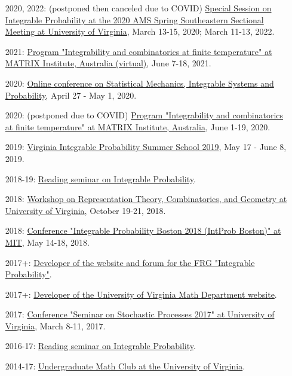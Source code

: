\documentclass[letterpaper,11pt]{article}
\begin{document}
\begin{itemize}
\item [2020, 2022:]
(postponed then canceled due to COVID)
\href{http://www.ams.org/meetings/sectional/2273_program.html}{Special Session on Integrable Probability at the 2020 AMS Spring Southeastern Sectional Meeting at University of Virginia},
March 13-15, 2020; March 11-13, 2022.

\item [2021:]
\href{https://www.matrix-inst.org.au/events/integrability-and-combinatorics-at-finite-temperature/}{Program "Integrability and combinatorics at finite temperature" at MATRIX Institute, Australia (virtual)},
June 7-18, 2021.

\item [2020:]
\href{http://mtikhonov.com/smisp/}{Online conference on Statistical Mechanics, Integrable Systems and Probability},
April 27 - May 1, 2020.

\item [2020:]
(postponed due to COVID)
\href{https://www.matrix-inst.org.au/events/integrability-and-combinatorics-at-finite-temperature/}{Program "Integrability and combinatorics at finite temperature" at MATRIX Institute, Australia},
June 1-19, 2020.

\item [2019:]
\href{http://vipss.int-prob.org/}{Virginia Integrable Probability Summer School 2019},
May 17 - June 8, 2019.

\item[2018-19:]
\href{https://lpetrov.cc/reading-2019/}{Reading seminar on Integrable Probability}.

\item [2018:]
\href{http://math.virginia.edu/ims/workshop-fall-2018/}{Workshop on Representation Theory, Combinatorics, and Geometry at University of Virginia},
October 19-21, 2018.

\item [2018:]
\href{http://frg.int-prob.org/conference2018/}{Conference "Integrable Probability Boston 2018 (IntProb Boston)" at MIT},
May 14-18, 2018.

\item [2017+:]
\href{http://frg.int-prob.org/}{Developer of the website and forum for the FRG "Integrable Probability"}.

\item [2017+:]
\href{http://math.virginia.edu/}{Developer of the University of Virginia Math Department website}.

\item [2017:]
\href{http://faculty.virginia.edu/ssp17/}{Conference "Seminar on Stochastic Processes 2017" at University of Virginia},
March 8-11, 2017.

\item [2016-17:]
\href{https://lpetrov.cc/2016/12/reading-seminar/}{Reading seminar on Integrable Probability}.

\item [2014-17:]
\href{http://math.virginia.edu/seminars/mathclub/}{Undergraduate Math Club at the University of Virginia}.
\end{itemize}
\end{document}
